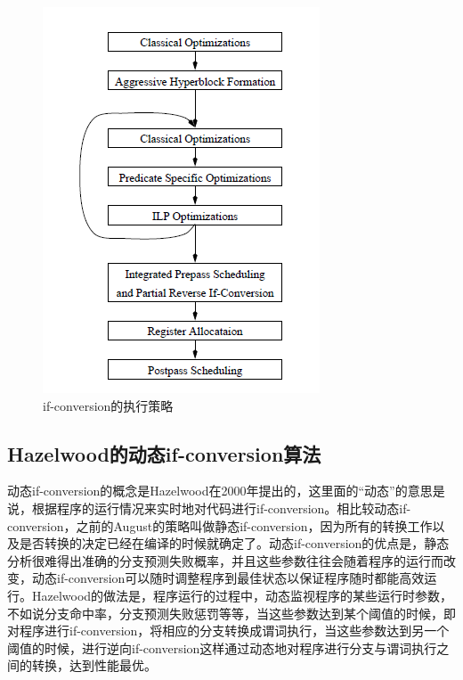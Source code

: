 \begin{figure}
\includegraphics[width=\linewidth]{ifcvt-framework}
\caption{\label{fig:ifcvtframework} if-conversion的执行策略}
\end{figure}

\subsection{Hazelwood的动态if-conversion算法}

动态if-conversion的概念是Hazelwood在2000年提出的\cite{Hazelwood00alightweight}，这里面的“动态”的意思是说，根据程序的运行情况来实时地对代码进行if-conversion。相比较动态if-conversion，之前的August的策略叫做静态if-conversion，因为所有的转换工作以及是否转换的决定已经在编译的时候就确定了。动态if-conversion的优点是，静态分析很难得出准确的分支预测失败概率，并且这些参数往往会随着程序的运行而改变，动态if-conversion可以随时调整程序到最佳状态以保证程序随时都能高效运行。Hazelwood的做法是，程序运行的过程中，动态监视程序的某些运行时参数，不如说分支命中率，分支预测失败惩罚等等，当这些参数达到某个阈值的时候，即对程序进行if-conversion，将相应的分支转换成谓词执行，当这些参数达到另一个阈值的时候，进行逆向if-conversion这样通过动态地对程序进行分支与谓词执行之间的转换，达到性能最优。